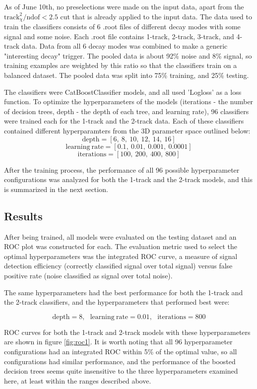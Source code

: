 \documentclass[12pt, letterpaper]{article}
\begin{document}
As of June 10th, no preselections were made on the input data, apart from the $\mathrm{track}_\chi^2 / \mathrm{ndof} < 2.5$ cut that is already applied to the input data. The data used to train the classifiers consists of 6 .root files of different decay modes with some signal and some noise. Each .root file contains 1-track, 2-track, 3-track, and 4-track data. Data from all 6 decay modes was combined to make a generic "interesting decay" trigger. The pooled data is about 92\% noise and 8\% signal, so training examples are weighted by this ratio so that the classifiers train on a balanced dataset. The pooled data was split into 75\% training, and 25\% testing.

The classifiers were CatBoostClassifier models, and all used 'Logloss' as a loss function. To optimize the hyperparameters of the models (iterations - the number of decision trees, depth - the depth of each tree, and learning rate), 96 classifiers were trained each for the 1-track and the 2-track data. Each of these classifiers contained different hyperparamters from the 3D parameter space outlined below:
$$\mathrm{depth} = [6,\:8,\:10,\:12,\:14,\:16]$$
$$\mathrm{learning \: rate} = [0.1,\:0.01,\:0.001,\:0.0001]$$
$$\mathrm{iterations} = [100,\:200,\:400,\:800]$$

After the training process, the performance of all 96 possible hyperparameter configurations was analyzed for both the 1-track and the 2-track models, and this is summarized in the next section.

\subsection{Results}
After being trained, all models were evaluated on the testing dataset and an ROC plot was constructed for each. The evaluation metric used to select the optimal hyperparameters was the integrated ROC curve, a measure of signal detection efficiency (correctly classified signal over total signal) versus false positive rate (noise classified as signal over total noise).

The same hyperparameters had the best performance for both the 1-track and the 2-track classifiers, and the hyperparameters that performed best were:

$$\mathrm{depth} = 8, \: \: \: \mathrm{learning \: rate} = 0.01, \: \: \: \mathrm{iterations} = 800$$

ROC curves for both the 1-track and 2-track models with these hyperparameters are shown in figure \ref{fig:roc1}. It is worth noting that all 96 hyperparameter configurations had an integrated ROC within 5\% of the optimal value, so all configurations had similar performance, and the performance of the boosted decision trees seems quite insensitive to the three hyperparameters examined here, at least within the ranges described above.
\end{document}
